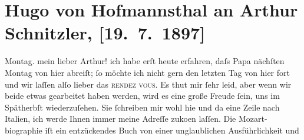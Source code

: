 

         
         \renewcommand{\erwaehntePersonen}{Personen: Richard Beer-Hofmann, Hugo August von Hofmannsthal, Wolfgang Amadeus Mozart}
         \renewcommand{\erwaehnteOrte}{Orte: Bad Fusch, Italien, Wien}
         \renewcommand{\erwaehnteWerke}{Werke: W. A. Mozart}
               \section[Hugo von Hofmannsthal an Arthur Schnitzler, {[}19. 7. 1897{]}]{ Hugo von Hofmannsthal an Arthur Schnitzler, {[}19. 7. 1897{]}}\nopagebreak{}\rehead{ }\begin{ledgroupsized}[t]{13cm}\normalsize\beginnumbering \toendnotes[C]{\smallbreak\pagebreak[2]} 
\toendnotes[C]{\smallbreak}\pstart
           \raggedleft{}{\pb}Montag.\pend
           \pstart{}mein lieber Arthur!\pend\pstart
           ich habe erſt heute erfahren, daſs Papa nächſten Montag von hier abreiſt; ſo möchte ich nicht gern den
               letzten Tag von hier fort und wir laſſen alſo lieber das \textsc{rendez
                  vous}. Es thut mir ſehr leid, aber wenn wir beide etwas gearbeitet haben
               werden, wird es eine große Freude ſein, uns im Spätherbſt wieder{\pb}zuſehen. Sie ſchreiben mir wohl
               hie und da eine Zeile nach Italien, ich werde
               Ihnen immer meine Adreſſe zuko{\geminationm}en laſſen.\pend
           \pstart
           Die Mozart-biographie iſt ein entzückendes Buch von einer unglaublichen Ausführlichkeit und

\end{ledgroupsized}
